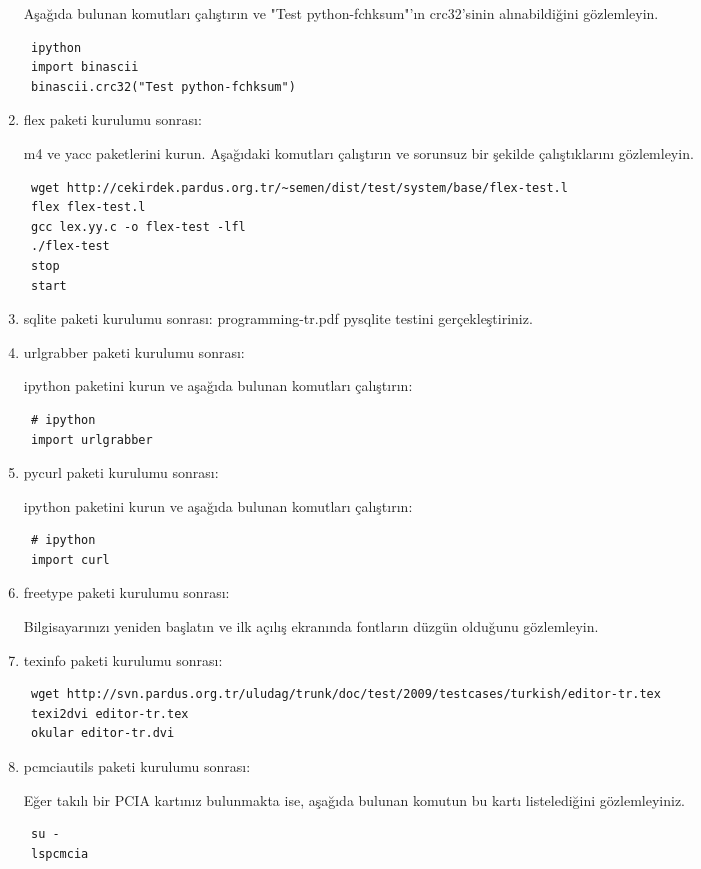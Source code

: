 \documentclass[a4paper,10pt]{article}
\begin{document}
\begin{enumerate}
Aşağıda bulunan komutları çalıştırın ve "Test python-fchksum"'ın crc32'sinin alınabildiğini gözlemleyin.
\begin{verbatim}
 ipython
 import binascii
 binascii.crc32("Test python-fchksum")
\end{verbatim}

\item flex paketi kurulumu sonrası:

m4 ve yacc paketlerini kurun.
Aşağıdaki komutları çalıştırın ve sorunsuz bir şekilde çalıştıklarını gözlemleyin.
\begin{verbatim}
 wget http://cekirdek.pardus.org.tr/~semen/dist/test/system/base/flex-test.l
 flex flex-test.l
 gcc lex.yy.c -o flex-test -lfl 
 ./flex-test
 stop
 start
\end{verbatim}


\item sqlite paketi kurulumu sonrası:
programming-tr.pdf pysqlite testini gerçekleştiriniz.

\item urlgrabber paketi kurulumu sonrası:

ipython paketini kurun ve aşağıda bulunan komutları çalıştırın:
\begin{verbatim}
 # ipython
 import urlgrabber
\end{verbatim}

\item pycurl paketi kurulumu sonrası:

ipython paketini kurun ve aşağıda bulunan komutları çalıştırın:
\begin{verbatim}
 # ipython
 import curl
\end{verbatim}

\item freetype paketi kurulumu sonrası: 

Bilgisayarınızı yeniden başlatın ve ilk açılış ekranında fontların düzgün olduğunu gözlemleyin.
\item texinfo paketi kurulumu sonrası:
\begin{verbatim}
 wget http://svn.pardus.org.tr/uludag/trunk/doc/test/2009/testcases/turkish/editor-tr.tex
 texi2dvi editor-tr.tex
 okular editor-tr.dvi
\end{verbatim}


\item pcmciautils paketi kurulumu sonrası:

Eğer takılı bir PCIA kartınız bulunmakta ise, aşağıda bulunan komutun bu kartı listelediğini gözlemleyiniz.
\begin{verbatim}
 su -
 lspcmcia
\end{verbatim}




\end{enumerate}
\end{document}
